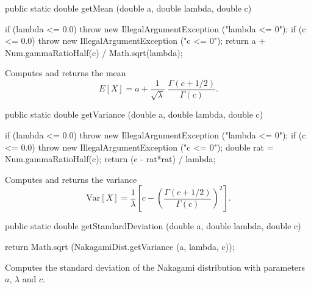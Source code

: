 \begin{code}

   public static double getMean (double a, double lambda, double c)\begin{hide} {
      if (lambda <= 0.0)
         throw new IllegalArgumentException ("lambda <= 0");
      if (c <= 0.0)
         throw new IllegalArgumentException ("c <= 0");
      return a + Num.gammaRatioHalf(c) / Math.sqrt(lambda);
   }\end{hide}
\end{code}
\begin{tabb}  Computes and returns the mean
 $$
E[X] = a + \frac{1}{\sqrt{\lambda}}\; \frac{\Gamma(c+1/2)}{\Gamma(c)}.
$$
\end{tabb}
\begin{htmlonly}
\end{htmlonly}
\begin{code}

   public static double getVariance (double a, double lambda, double c)\begin{hide} {
      if (lambda <= 0.0)
         throw new IllegalArgumentException ("lambda <= 0");
      if (c <= 0.0)
         throw new IllegalArgumentException ("c <= 0");
      double rat = Num.gammaRatioHalf(c);
      return (c - rat*rat) / lambda;
   }\end{hide}
\end{code}
\begin{tabb}  Computes and returns the variance
 $$
\mbox{Var}[X] = \frac{1}{\lambda} \left[c -
\left(\frac{\Gamma(c+1/2)}{\Gamma(c)}\right)^2\right].
$$
\end{tabb}
\begin{htmlonly}
\end{htmlonly}
\begin{code}

   public static double getStandardDeviation (double a, double lambda,
                                              double c) \begin{hide} {
      return Math.sqrt (NakagamiDist.getVariance (a, lambda, c));
   }\end{hide}
\end{code}
\begin{tabb}  Computes the standard deviation of the Nakagami distribution with
   parameters $a$, $\lambda$ and $c$.
\end{tabb}

